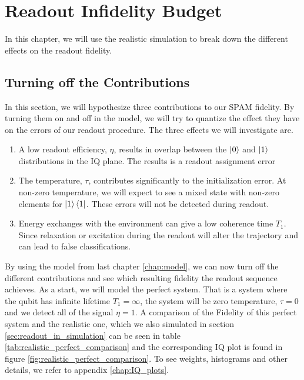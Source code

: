 \chapter{Readout Infidelity Budget} \label{chap:budget}
In this chapter, we will use the realistic simulation to break down the different effects on the readout fidelity. 

\section{Turning off the Contributions}
In this section, we will hypothesize three contributions to our SPAM fidelity. By  turning them on and off in the model, we will try to quantize the effect they have on the errors of our readout procedure. The three effects we will investigate are.
\begin{enumerate}
    \item A low readout efficiency, $\eta$, results in overlap between the $\ket{0}$ and $\ket{1}$ distributions in the IQ plane. The results is a readout assignment error 
    \item The temperature, $\tau$, contributes significantly to the initialization error. At non-zero temperature, we will expect to see a mixed state with non-zero elements for $\ket{1}\bra{1}$. These errors will not be detected during readout. 
    \item Energy exchanges with the environment can give a low coherence time $T_1$. Since relaxation or excitation during the readout will alter the trajectory and can lead to false classifications.
\end{enumerate}
By using the model from last chapter \ref{chap:model}, we can now turn off the different contributions and see which resulting fidelity the readout sequence achieves. As a start, we will model the perfect system. That is a system where the qubit has infinite lifetime $T_1 = \infty$, the system will be zero temperature, $\tau = 0$ and we detect all of the signal $\eta = 1$. A comparison of the Fidelity of this perfect system and the realistic one, which we also simulated in section \ref{sec:readout_in_simulation} can be seen in table \ref{tab:realistic_perfect_comparison} and the corresponding IQ plot is found in figure \ref{fig:realistic_perfect_comparison}. To see weights, histograms and other details, we refer to appendix \ref{chap:IQ_plots}.

